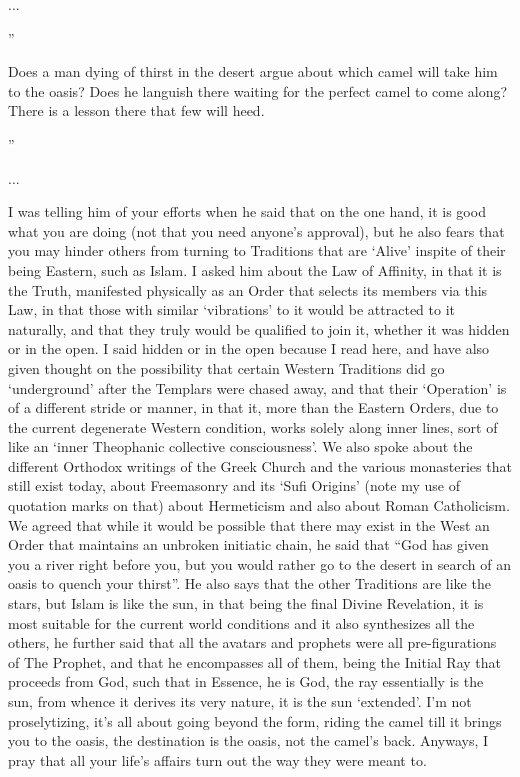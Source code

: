 \begin{footnotesize}
\begin{sffamily}
... 

''

Does a man dying of thirst in the desert argue about which camel will take him to the oasis? Does he languish there waiting for the perfect camel to come along? There is a lesson there that few will heed.

''

... 

I was telling him of your efforts when he said that on the one hand, it is good what you are doing (not that you need anyone's approval), but he also fears that you may hinder others from turning to Traditions that are `Alive' inspite of their being Eastern, such as Islam. I asked him about the Law of Affinity, in that it is the Truth, manifested physically as an Order that selects its members via this Law, in that those with similar `vibrations' to it would be attracted to it naturally, and that they truly would be qualified to join it, whether it was hidden or in the open. I said hidden or in the open because I read here, and have also given thought on the possibility that certain Western Traditions did go `underground' after the Templars were chased away, and that their `Operation' is of a different stride or manner, in that it, more than the Eastern Orders, due to the current degenerate Western condition, works solely along inner lines, sort of like an `inner Theophanic collective consciousness'. We also spoke about the different Orthodox writings of the Greek Church and the various monasteries that still exist today, about Freemasonry and its `Sufi Origins' (note my use of quotation marks on that) about Hermeticism and also about Roman Catholicism. We agreed that while it would be possible that there may exist in the West an Order that maintains an unbroken initiatic chain, he said that ``God has given you a river right before you, but you would rather go to the desert in search of an oasis to quench your thirst''. He also says that the other Traditions are like the stars, but Islam is like the sun, in that being the final Divine Revelation, it is most suitable for the current world conditions and it also synthesizes all the others, he further said that all the avatars and prophets were all pre-figurations of The Prophet, and that he encompasses all of them, being the Initial Ray that proceeds from God, such that in Essence, he is God, the ray essentially is the sun, from whence it derives its very nature, it is the sun `extended'. I'm not proselytizing, it's all about going beyond the form, riding the camel till it brings you to the oasis, the destination is the oasis, not the camel's back. Anyways, I pray that all your life's affairs turn out the way they were meant to.


\end{sffamily}
\end{footnotesize}
